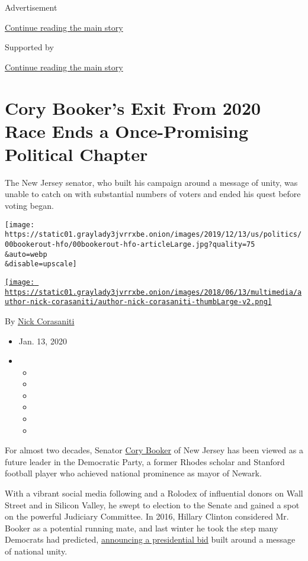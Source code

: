 Advertisement

\protect\hyperlink{after-top}{Continue reading the main story}

Supported by

\protect\hyperlink{after-sponsor}{Continue reading the main story}

\hypertarget{cory-bookers-exit-from-2020-race-ends-a-once-promising-political-chapter}{%
\section{Cory Booker's Exit From 2020 Race Ends a Once-Promising
Political
Chapter}\label{cory-bookers-exit-from-2020-race-ends-a-once-promising-political-chapter}}

The New Jersey senator, who built his campaign around a message of
unity, was unable to catch on with substantial numbers of voters and
ended his quest before voting began.

\texttt{[image: https://static01.graylady3jvrrxbe.onion/images/2019/12/13/us/politics/00bookerout-hfo/00bookerout-hfo-articleLarge.jpg?quality=75\\\&auto=webp\\\&disable=upscale]}

\href{https://www.nytimes3xbfgragh.onion/by/nick-corasaniti}{\texttt{[image: https://static01.graylady3jvrrxbe.onion/images/2018/06/13/multimedia/author-nick-corasaniti/author-nick-corasaniti-thumbLarge-v2.png]}}

By \href{https://www.nytimes3xbfgragh.onion/by/nick-corasaniti}{Nick
Corasaniti}

\begin{itemize}
\item
  Jan. 13, 2020
\item
  \begin{itemize}
  \item
  \item
  \item
  \item
  \item
  \item
  \end{itemize}
\end{itemize}

For almost two decades, Senator
\href{https://www.nytimes3xbfgragh.onion/interactive/2020/us/elections/cory-booker.html}{Cory
Booker} of New Jersey has been viewed as a future leader in the
Democratic Party, a former Rhodes scholar and Stanford football player
who achieved national prominence as mayor of Newark.

With a vibrant social media following and a Rolodex of influential
donors on Wall Street and in Silicon Valley, he swept to election to the
Senate and gained a spot on the powerful Judiciary Committee. In 2016,
Hillary Clinton considered Mr. Booker as a potential running mate, and
last winter he took the step many Democrats had predicted,
\href{https://www.nytimes3xbfgragh.onion/2019/02/01/us/politics/cory-booker-2020.html}{announcing
a presidential bid} built around a message of national unity.

